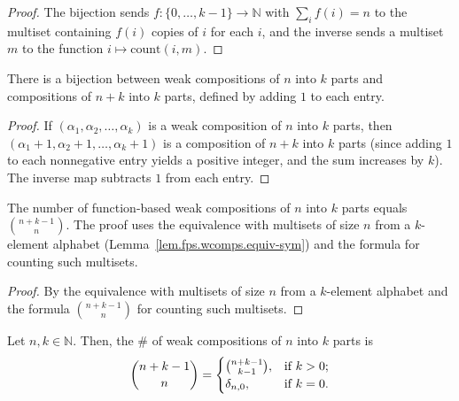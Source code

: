 \begin{proof}
\leanok
The bijection sends $f : \{0, \ldots, k-1\} \to \mathbb{N}$ with $\sum_i f(i) = n$
to the multiset containing $f(i)$ copies of $i$ for each $i$, and the inverse sends a
multiset $m$ to the function $i \mapsto \text{count}(i, m)$.
\end{proof}

\begin{lemma}
\label{lem.fps.wcomps.to-composition}
\leanhelper
\leanok
There is a bijection between weak compositions of $n$ into $k$ parts
and compositions of $n+k$ into $k$ parts, defined by adding $1$ to each entry.
\end{lemma}

\begin{proof}
\leanok
If $\left(  \alpha_{1},\alpha_{2},\ldots,\alpha_{k}\right)  $ is a weak
composition of $n$ into $k$ parts, then $\left(  \alpha_{1}%
+1,\alpha_{2}+1,\ldots,\alpha_{k}+1\right)  $ is a composition of $n+k$ into
$k$ parts (since adding $1$ to each nonnegative entry yields a positive integer,
and the sum increases by $k$).
The inverse map subtracts $1$ from each entry.
\end{proof}

\begin{lemma}
\label{lem.fps.wcomps.card-eq}
\leanhelper
\leanok
The number of function-based weak compositions of $n$ into $k$ parts
equals $\binom{n+k-1}{n}$. The proof uses the equivalence with
multisets of size $n$ from a $k$-element alphabet (Lemma~\ref{lem.fps.wcomps.equiv-sym})
and the formula for counting such multisets.
\end{lemma}

\begin{proof}
\leanok
By the equivalence with multisets of size $n$ from a $k$-element alphabet and the formula
$\binom{n + k - 1}{n}$ for counting such multisets.
\end{proof}

\begin{theorem}
\label{thm.fps.comps.num-wcomps-n-k}
\leantarget
\leanok
Let $n,k\in\mathbb{N}$. Then, the \# of
weak compositions of $n$ into $k$ parts is
\[
\dbinom{n+k-1}{n}=%
\begin{cases}
\dbinom{n+k-1}{k-1}, & \text{if }k>0;\\
\delta_{n,0}, & \text{if }k=0.
\end{cases}
\]
\end{theorem}

